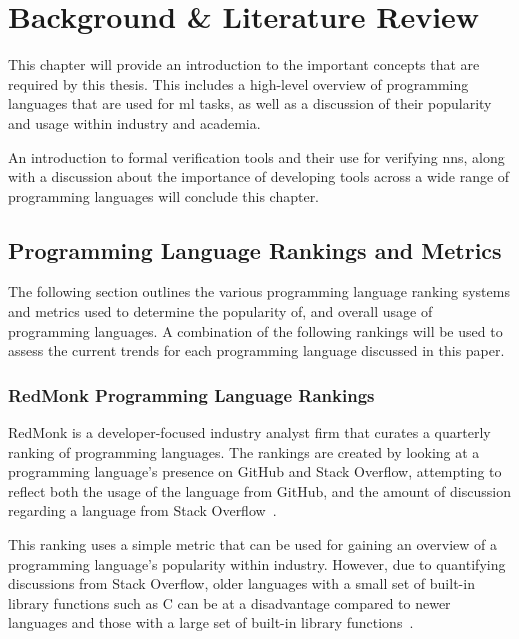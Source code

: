 
\chapter{Background \& Literature Review}\label{Chapter2}


This chapter will provide an introduction to the important concepts that are required by this thesis.
This includes a high-level overview of programming languages that are used for \Gls{ml} tasks, as well
as a discussion of their popularity and usage within industry and academia.


An introduction to formal verification tools and their use for verifying \Glspl{nn}, along with a discussion
about the importance of developing tools across a wide range of programming languages will conclude this chapter.

\section{Programming Language Rankings and Metrics}
The following section outlines the various programming language ranking systems and metrics used to
determine the popularity of, and overall usage of programming languages. A combination of the following rankings will
be used to assess the current trends for each programming language discussed in this paper.

\subsection{RedMonk Programming Language Rankings}

RedMonk is a developer-focused industry analyst firm that curates a quarterly ranking of programming languages. 
The rankings are created by looking at a programming language's presence on GitHub and Stack Overflow, attempting
to reflect both the usage of the language from GitHub, and the amount of discussion regarding a language from Stack Overflow~\citep{redmonk}.

This ranking uses a simple metric that can be used for gaining an overview of a programming language's popularity within industry. However, due to quantifying discussions from 
Stack Overflow, older languages with a small set of built-in library functions such as C can be at a disadvantage
compared to newer languages and those with a large set of built-in library functions~\citep{opensource}.

